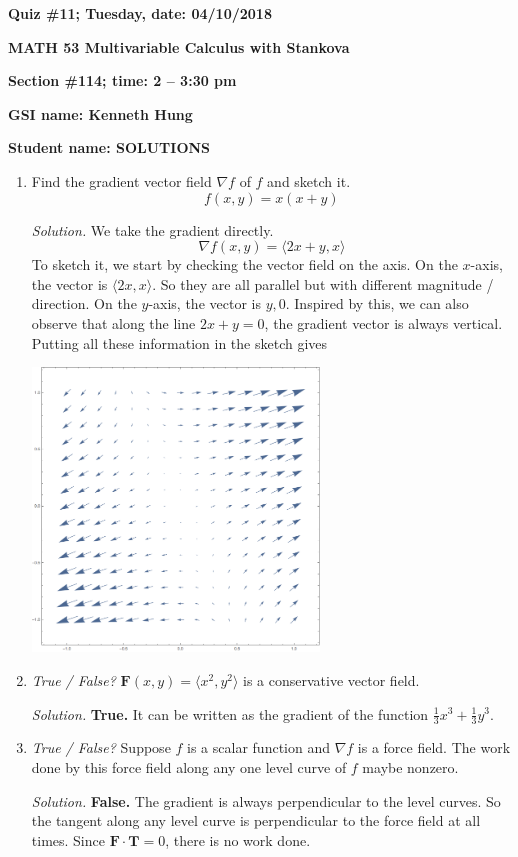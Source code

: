 \documentclass{article}
\begin{document}
{\bf Quiz \#11; Tuesday, date: 04/10/2018}

{\bf MATH 53 Multivariable Calculus with Stankova}

{\bf Section \#114; time: 2 -- 3:30 pm}

{\bf GSI name: Kenneth Hung}

{\bf Student name: SOLUTIONS}

\vspace*{0.25in}

\begin{enumerate}
\item Find the gradient vector field $\nabla f$ of $f$ and sketch it.
\[
f(x, y) = x(x+y)
\]

{\em Solution.} We take the gradient directly.
\[
\nabla f(x, y) = \langle 2x + y, x \rangle
\]
To sketch it, we start by checking the vector field on the axis. On the $x$-axis, the vector is $\langle 2x, x \rangle$. So they are all parallel but with different magnitude / direction. On the $y$-axis, the vector is $y, 0$. Inspired by this, we can also observe that along the line $2x + y = 0$, the gradient vector is always vertical. Putting all these information in the sketch gives
\begin{center}
\includegraphics[width=0.6\textwidth]{quiz11dis114solpic}
\end{center}

\item {\em True / False?} $\mathbf{F}(x, y) = \langle x^2, y^2 \rangle$ is a conservative vector field.

{\em Solution.} {\bf True.} It can be written as the gradient of the function $\frac{1}{3} x^3 + \frac{1}{3} y^3$.

\item {\em True / False?} Suppose $f$ is a scalar function and $\nabla f$ is a force field. The work done by this force field along any one level curve of $f$ maybe nonzero.

{\em Solution.} {\bf False.} The gradient is always perpendicular to the level curves. So the tangent along any level curve is perpendicular to the force field at all times. Since $\mathbf{F} \cdot \mathbf{T} = 0$, there is no work done.

\end{enumerate}
\end{document}
